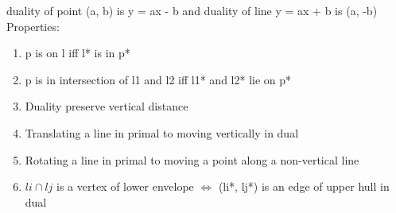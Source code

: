 duality of point (a, b) is y = ax - b and duality of line y = ax + b is (a, -b) \\
Properties:
\begin{enumerate}
    \item p is on l iff l* is in p*
    \item p is in intersection of l1 and l2 iff l1* and l2* lie on p*
    \item Duality preserve vertical distance
    \item Translating a line in primal to moving vertically in dual
    \item Rotating a line in primal to moving a point along a non-vertical line
    \item $li \cap lj$ is a vertex of lower envelope $\Longleftrightarrow$ (li*, lj*) is an edge of upper hull in dual
\end{enumerate}
\hline
